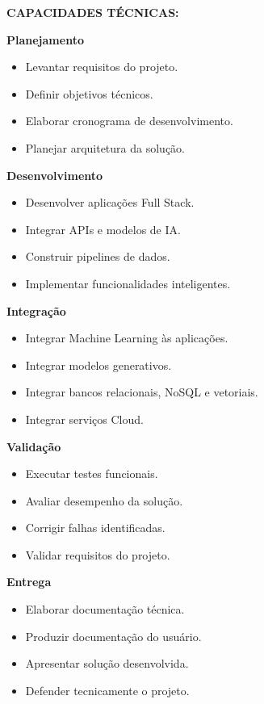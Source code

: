 \textbf{CAPACIDADES TÉCNICAS:}

\textbf{Planejamento}

\begin{itemize}
\item Levantar requisitos do projeto.
\item Definir objetivos técnicos.
\item Elaborar cronograma de desenvolvimento.
\item Planejar arquitetura da solução.
\end{itemize}

\textbf{Desenvolvimento}

\begin{itemize}
\item Desenvolver aplicações Full Stack.
\item Integrar APIs e modelos de IA.
\item Construir pipelines de dados.
\item Implementar funcionalidades inteligentes.
\end{itemize}

\textbf{Integração}

\begin{itemize}
\item Integrar Machine Learning às aplicações.
\item Integrar modelos generativos.
\item Integrar bancos relacionais, NoSQL e vetoriais.
\item Integrar serviços Cloud.
\end{itemize}

\textbf{Validação}

\begin{itemize}
\item Executar testes funcionais.
\item Avaliar desempenho da solução.
\item Corrigir falhas identificadas.
\item Validar requisitos do projeto.
\end{itemize}

\textbf{Entrega}

\begin{itemize}
\item Elaborar documentação técnica.
\item Produzir documentação do usuário.
\item Apresentar solução desenvolvida.
\item Defender tecnicamente o projeto.
\end{itemize}

